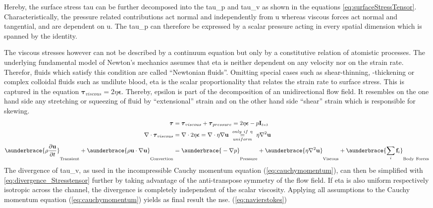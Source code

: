 Hereby, the surface stress \gls{tau} can be further decomposed into the \gls{tau_p} and \gls{tau_v} as shown in the equations \cref{eq:surfaceStressTensor}. Characteristically, the pressure related contributions act normal and independently from \gls{u} whereas viscous forces act normal and tangential, and are dependent on \gls{u}. The \gls{tau_p} can therefore be expressed by a scalar pressure acting in every spatial dimension which is spanned by the identity. 

The viscous stresses however can not be described by a continuum equation but only by a constitutive relation of atomistic processes. The underlying fundamental model of Newton's mechanics assumes that \gls{eta} is neither dependent on any velocity nor on the strain rate. Therefor, fluids which satisfy this condition are called ``Newtonian fluids''. Omitting special cases such as shear-thinning, -thickening or complex colloidal fluids such as undilute blood, \gls{eta} is the scalar proportionality that relates the strain rate to surface stress.\cite{lit:fluidic:kirby} This is captured in the equation $\boldsymbol{\tau}_{viscous} = 2\eta \mathbf{\epsilon} $. Thereby, \gls{epsilon} is part of the decomposition of an unidirectional flow field. It resembles on the one hand side any stretching or squeezing of fluid by ``extensional'' strain and on the other hand side ``shear'' strain which is responsible for skewing.\cite{lit:fluidic:kirby}
\begin{align}
	\boldsymbol{\tau} &= \boldsymbol{\tau}_{viscous} +  \boldsymbol{\tau}_{pressure} = 2\eta \boldsymbol{\epsilon} - p \mathbf{I}_{\scaleto{3 \times 3}{4pt}} \label{eq:surfaceStressTensor}\\
	\nabla \cdot \boldsymbol{\tau}_{viscous} &= \nabla \cdot 2\eta \boldsymbol{\epsilon} = \nabla \cdot \eta \nabla \mathbf{u} \ \underset{uniform}{\overset{only \ if \ \eta}{=}} \ \eta \nabla^2 \mathbf{u} 	\label{eq:divergence_Stresstensor} \\
	\aunderbrace{\vphantom{\sum_{i}} \rho \frac{\partial \mathbf{u}}{\partial t}}_{\mathrm{Transient}} + \aunderbrace{\vphantom{\sum_{i}}\rho\mathbf{u} \cdot \nabla \mathbf{u}}_{\mathrm{Convection}} &= \aunderbrace{\vphantom{\sum_{i}}-\nabla p}_{\mathrm{Pressure}} + \aunderbrace{\vphantom{\sum_{i}}\eta \nabla^2 \mathbf{u}}_{\mathrm{Viscous}} + \aunderbrace{\sum_{i}\mathbf{f}_i}_{\mathrm{Body \ Forces}} \label{eq:navierstokes}
\end{align}
The divergence of \gls{tau_v}, as used in the incompressible Cauchy momentum equation (\cref{eq:cauchymomentum}), can then be simplified with \cref{eq:divergence_Stresstensor} further by taking advantage of the anti-transpose symmetry of the flow field. If \gls{eta} is also uniform respectively isotropic across the channel, the divergence is completely independent of the scalar viscosity.  Applying all assumptions to the Cauchy momentum equation (\cref{eq:cauchymomentum}) yields as final result the \gls{nse}. (\cref{eq:navierstokes}) 

